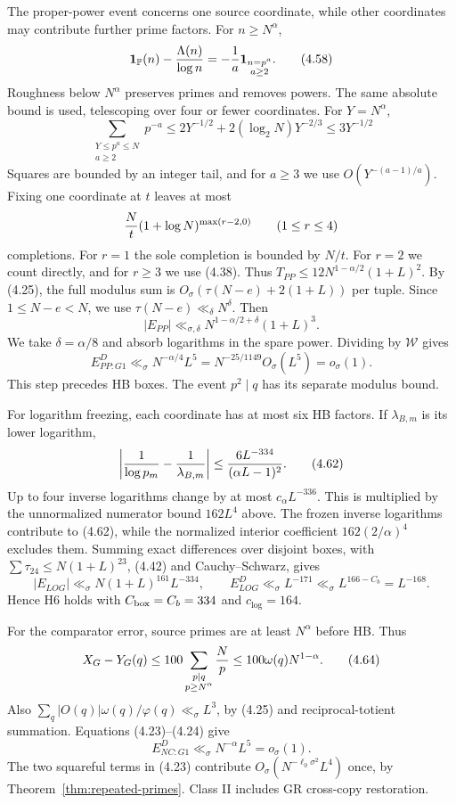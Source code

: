 The proper-power event concerns one source coordinate,
while other coordinates may contribute further prime factors.
For $n\ge N^\alpha$,
\[
 \mathbf1_{\mathbb P}(n)-{\Lambda(n)\over\log n}
       =-{1\over a}\mathbf1_{\substack{n=p^a\\a\ge2}}.
 \tag{4.58}
\]
Roughness below $N^\alpha$ preserves primes and removes powers.
The same absolute bound is used, telescoping over four or fewer coordinates.
For $Y=N^\alpha$,
\[
 \sum_{\substack{Y\le p^a\le N\\a\ge2}}p^{-a}
 \le2Y^{-1/2}+2(\log_2N)Y^{-2/3}\le3Y^{-1/2}
 \tag{4.59}
\]
Squares are bounded by an integer tail, and for $a\ge3$ we use $O(Y^{-(a-1)/a})$.
Fixing one coordinate at $t$ leaves at most
\[
 {N\over t}(1+\log N)^{\max(r-2,0)}\qquad(1\le r\le4)
\]
completions.
For $r=1$ the sole completion is bounded by $N/t$.
For $r=2$ we count directly, and for $r\ge3$ we use (4.38).
Thus $T_{PP}\le12N^{1-\alpha/2}(1+L)^2$.
By (4.25), the full modulus sum is
$O_\sigma(\tau(N-e)+2(1+L))$ per tuple.
Since $1\le N-e<N$, we use $\tau(N-e)\ll_\delta N^\delta$.
Then
\[
 |E_{PP}|\ll_{\sigma,\delta}N^{1-\alpha/2+\delta}(1+L)^3.
 \tag{4.60}
\]
We take $\delta=\alpha/8$ and absorb logarithms in the spare power.
Dividing by $\mathcal W$ gives
\[
 E^D_{PP:G1}\ll_\sigma N^{-\alpha/4}L^5
      =N^{-25/1149}O_\sigma(L^5)=o_\sigma(1).
 \tag{4.61}
\]
This step precedes HB boxes.
The event $p^2\mid q$ has its separate modulus bound.

For logarithm freezing, each coordinate has at most six HB factors.
If $\lambda_{B,m}$ is its lower logarithm,
\[
 \left|{1\over\log p_m}-{1\over\lambda_{B,m}}\right|
 \le {6L^{-334}\over(\alpha L-1)^2}.
 \tag{4.62}
\]
Up to four inverse logarithms change by at most $c_\alpha L^{-336}$.
This is multiplied by the unnormalized numerator bound $162L^4$ above.
The frozen inverse logarithms contribute to (4.62),
while the normalized interior coefficient $162(2/\alpha)^4$ excludes them.
Summing exact differences over disjoint boxes,
with $\sum\tau_{24}\le N(1+L)^{23}$, (4.42) and Cauchy--Schwarz, gives
\[
 |E_{LOG}|\ll_\sigma N(1+L)^{161}L^{-334},\qquad
 E^D_{LOG}\ll_\sigma L^{-171}\ll_\sigma L^{166-C_b}=L^{-168}.
 \tag{4.63}
\]
Hence H6 holds with $C_{\rm box}=C_b=334$ and $c_{\log}=164$.

For the comparator error, source primes are at least $N^\alpha$ before HB.
Thus
\[
 X_G-Y_G(q)
 \le100\sum_{\substack{p\mid q\\p\ge N^\alpha}}{N\over p}
 \le100\omega(q)N^{1-\alpha}.
 \tag{4.64}
\]
Also $\sum_q|O(q)|\omega(q)/\varphi(q)\ll_\sigma L^3$, by (4.25) and reciprocal-totient summation.
Equations (4.23)--(4.24) give
\[
 E^D_{NC:G1}\ll_\sigma N^{-\alpha}L^5=o_\sigma(1).
 \tag{4.65}
\]
The two squareful terms in (4.23) contribute
$O_\sigma(N^{-\ell_0\sigma^2}L^4)$ once, by Theorem~\ref{thm:repeated-primes}.
Class II includes GR cross-copy restoration.

